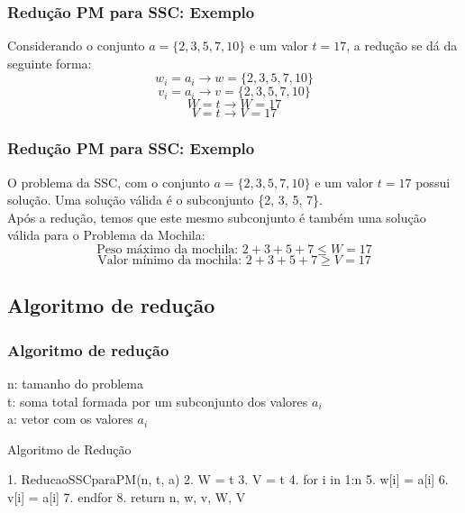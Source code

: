 \documentclass{beamer}
\begin{document}
\begin{frame}
    \frametitle{Redução PM para SSC: Exemplo}
        Considerando o conjunto $a = \{2, 3, 5, 7, 10\}$ e um valor $t = 17$, a redução se dá da seguinte forma:
        \begin{equation*}
            w_{i} = a_{i} \longrightarrow w = \{2, 3, 5, 7, 10\}
        \end{equation*}
        \begin{equation*}
            v_{i} = a_{i} \longrightarrow v = \{2, 3, 5, 7, 10\}
        \end{equation*}
        \begin{equation*}
            W = t \longrightarrow W = 17
        \end{equation*}
        \begin{equation*}
            V = t \longrightarrow V = 17
         \end{equation*}
\end{frame}

\begin{frame}
    \frametitle{Redução PM para SSC: Exemplo}
        O problema da SSC, com o conjunto $a = \{2, 3, 5, 7, 10\}$ e um valor $t = 17$ possui solução.
        Uma solução válida é o subconjunto \{2, 3, 5, 7\}.\\
        Após a redução, temos que este mesmo subconjunto é também uma solução válida para o Problema da Mochila:
        \begin{equation*}
            \mbox{Peso máximo da mochila: } 2 + 3 + 5 + 7 \leq W = 17
        \end{equation*}
        \begin{equation*}
            \mbox{Valor mínimo da mochila: } 2 + 3 + 5 + 7 \geq V = 17
        \end{equation*}

\end{frame}

\subsection{Algoritmo de redução}
\begin{frame}[fragile]
\frametitle{Algoritmo de redução}
    n: tamanho do problema \\
    t: soma total formada por um subconjunto dos valores $a_{i}$ \\
    a: vetor com os valores $a_{i}$ \\
    \begin{block}{Algoritmo de Redução}
        \begin{semiverbatim}
        1. ReducaoSSCparaPM(n, t, a)
        2.    W = t
        3.    V = t
        4.    for i in 1:n
        5.        w[i] = a[i]
        6.        v[i] = a[i]
        7.    endfor
        8.    return n, w, v, W, V
        \end{semiverbatim}
    \end{block}
\end{frame}
\end{document}
